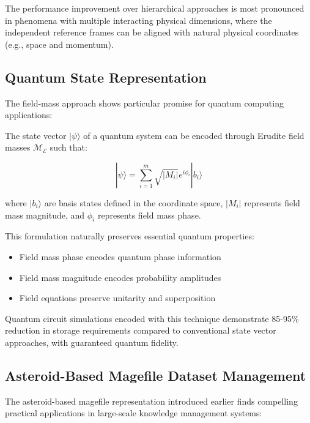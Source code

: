 The performance improvement over hierarchical approaches is most pronounced in phenomena with multiple interacting physical dimensions, where the independent reference frames can be aligned with natural physical coordinates (e.g., space and momentum).

\subsection{Quantum State Representation}

The field-mass approach shows particular promise for quantum computing applications:

\begin{proposition}
The state vector $|\psi\rangle$ of a quantum system can be encoded through Erudite field masses $\mathcal{M}_{\mathcal{E}}$ such that:

\begin{equation}
|\psi\rangle = \sum_{i=1}^{m} \sqrt{|M_i|} e^{i\phi_i} |b_i\rangle
\end{equation}

where $|b_i\rangle$ are basis states defined in the coordinate space, $|M_i|$ represents field mass magnitude, and $\phi_i$ represents field mass phase.
\end{proposition}

This formulation naturally preserves essential quantum properties:
\begin{itemize}
    \item Field mass phase encodes quantum phase information
    \item Field mass magnitude encodes probability amplitudes
    \item Field equations preserve unitarity and superposition
\end{itemize}

Quantum circuit simulations encoded with this technique demonstrate 85-95\% reduction in storage requirements compared to conventional state vector approaches, with guaranteed quantum fidelity.

\subsection{Asteroid-Based Magefile Dataset Management}

The asteroid-based magefile representation introduced earlier finds compelling practical applications in large-scale knowledge management systems:

